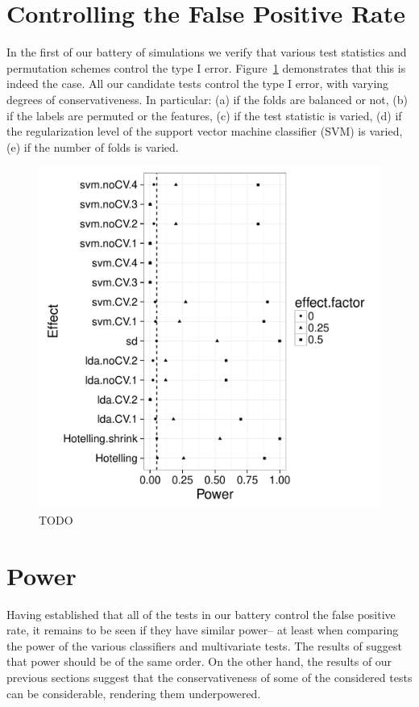 \documentclass[12pt,a4paper]{article}
\begin{document}
\section{Controlling the False Positive Rate}
\label{sec:type_i}

In the first of our battery of simulations we verify that various test statistics and permutation schemes control the type I error. 
Figure~\ref{fig:simulation_1} demonstrates that this is indeed the case. 
All our candidate tests control the type I error, with varying degrees of conservativeness. 
In particular:
(a) if the folds are balanced or not,
(b) if the labels are permuted or the features, 
(c) if the test statistic is varied, 
(d) if the regularization level of the support vector machine classifier (SVM) is varied,
(e) if the number of folds is varied.




\begin{figure}[h]
\centering
\includegraphics[width=0.7\linewidth]{"art/2016-07-26 20-55-48"}
\caption{
	\label{fig:simulation_1}
	TODO}
\end{figure}




\section{Power}
\label{sec:power}

Having established that all of the tests in our battery control the false positive rate, it remains to be seen if they have similar power-- at least when comparing the power of the various classifiers and multivariate tests. 
The results of \cite{ramdas_classification_2016} suggest that power should be of the same order. 
On the other hand, the results of our previous sections suggest that the conservativeness of some of the considered tests can be considerable, rendering them underpowered. 
\end{document}

